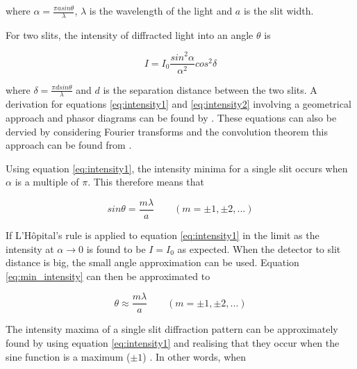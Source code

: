 \documentclass{article}
\begin{document}
\vspace{2mm}
\noindent
where $\alpha = \frac{\pi asin{\theta}}{\lambda}$, $\lambda$ is the wavelength of the light and $a$ is the slit width.

\vspace{2mm}
\noindent
For two slits, the intensity of diffracted light into an angle $\theta$ \cite{Paper02} is

\begin{equation}
\label{eq:intensity2}
I = I_0 \frac{sin^2{\alpha}}{\alpha^2} cos^2{\delta}
\end{equation}

\vspace{2mm}
\noindent
where $\delta = \frac{\pi dsin{\theta}}{\lambda}$ and $d$ is the separation distance between the two slits. A derivation for equations \eqref{eq:intensity1} and \eqref{eq:intensity2} involving a geometrical approach and phasor diagrams can be found by \cite{Book01}. These equations can also be dervied by considering Fourier transforms and the convolution theorem this approach can be found from \cite{Web01}.

\vspace{2mm}
\noindent
Using equation \eqref{eq:intensity1}, the intensity minima for a single slit occurs when $\alpha$ is a multiple of $\pi$. This therefore means that

\begin{equation}
\label{eq:min_intensity}
sin{\theta} = \frac{m \lambda}{a} \quad\quad(m = \pm1, \pm2, ...)
\end{equation}

\vspace{2mm}
\noindent
If L'H{\^o}pital's rule \cite{Book01} is applied to equation \eqref{eq:intensity1} in the limit as the intensity at $\alpha \rightarrow 0$ is found to be $I = I_0$ as expected. When the detector to slit distance is big, the small angle approximation can be used. Equation \eqref{eq:min_intensity} can then be approximated to

\begin{equation}
\label{eq:small_angle}
\theta \approx \frac{m\lambda}{a} \quad\quad(m = \pm1, \pm2, ...)
\end{equation}


\vspace{2mm}
\noindent
The intensity maxima of a single slit diffraction pattern can be approximately found by using equation \eqref{eq:intensity1} and realising that they occur when the sine function is a maximum ($\pm 1$) \cite{Book01}. In other words, when
\end{document}
